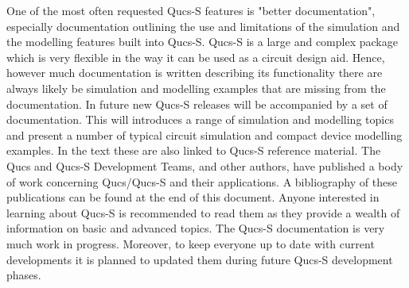 \noindent One of the most often requested Qucs-S features is "better documentation", especially documentation outlining the use and limitations of the simulation and the modelling features built into Qucs-S.  Qucs-S is a large and complex package which is very flexible in the way it can be used as a circuit design aid. Hence, however much documentation is written describing its functionality there are always likely be simulation and modelling examples that are missing from the documentation. In future new Qucs-S releases will be accompanied by a set of documentation. This will introduces a range of simulation and modelling topics and present a number of typical circuit simulation and compact device modelling examples. In the text these are also linked to Qucs-S reference material.  The Qucs and Qucs-S Development Teams, and other authors, have published a body of work concerning Qucs/Qucs-S and their applications. A bibliography of these publications can be found at the end of this document. Anyone interested in learning about Qucs-S is recommended to read them as they provide a wealth of information on basic and advanced topics.  The Qucs-S documentation is very much work in progress.  Moreover, to keep everyone up to date with current developments it is planned to updated them during future Qucs-S development phases.

